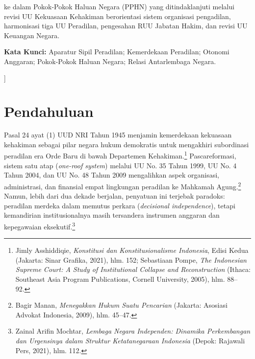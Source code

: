 \documentclass[12pt,a4paper,twocolumn]{article}
\begin{document}
\begin{@twocolumnfalse}
\begin{center}
\begin{minipage}{0.93\textwidth}
ke dalam Pokok-Pokok Haluan Negara (PPHN) yang ditindaklanjuti melalui revisi UU Kekuasaan Kehakiman berorientasi sistem organisasi pengadilan, harmonisasi tiga UU Peradilan, pengesahan RUU Jabatan Hakim, dan revisi UU Keuangan Negara.

                \vspace{0.4em}
                \noindent \textbf{Kata Kunci:} Aparatur Sipil Peradilan; Kemerdekaan Peradilan; Otonomi Anggaran; Pokok-Pokok Haluan Negara; Relasi Antarlembaga Negara.
            \end{minipage}
            \vspace{0.5em}
        \end{center}
    \end{@twocolumnfalse}
]

\section{Pendahuluan}

Pasal 24 ayat (1) UUD NRI Tahun 1945 menjamin kemerdekaan kekuasaan kehakiman sebagai pilar negara hukum demokratis untuk mengakhiri subordinasi peradilan era Orde Baru di bawah Departemen Kehakiman.\footnote{Jimly Asshiddiqie, \textit{Konstitusi dan Konstitusionalisme Indonesia}, Edisi Kedua (Jakarta: Sinar Grafika, 2021), hlm. 152; Sebastiaan Pompe, \textit{The Indonesian Supreme Court: A Study of Institutional Collapse and Reconstruction} (Ithaca: Southeast Asia Program Publications, Cornell University, 2005), hlm. 88--92.} Pascareformasi, sistem satu atap (\textit{one-roof system}) melalui UU No. 35 Tahun 1999, UU No. 4 Tahun 2004, dan UU No. 48 Tahun 2009 mengalihkan aspek organisasi, administrasi, dan finansial empat lingkungan peradilan ke Mahkamah Agung.\footnote{Bagir Manan, \textit{Menegakkan Hukum Suatu Pencarian} (Jakarta: Asosiasi Advokat Indonesia, 2009), hlm. 45--47.} Namun, lebih dari dua dekade berjalan, penyatuan ini terjebak paradoks: peradilan merdeka dalam memutus perkara (\textit{decisional independence}), tetapi kemandirian institusionalnya masih tersandera instrumen anggaran dan kepegawaian eksekutif.\footnote{Zainal Arifin Mochtar, \textit{Lembaga Negara Independen: Dinamika Perkembangan dan Urgensinya dalam Struktur Ketatanegaraan Indonesia} (Depok: Rajawali Pers, 2021), hlm. 112.}
\end{document}
